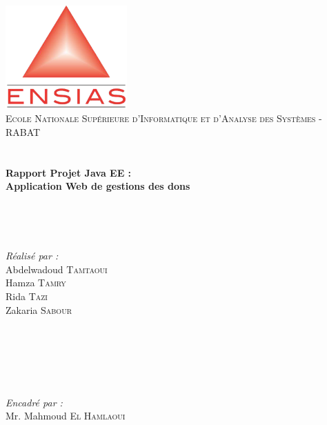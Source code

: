 \begin{titlepage}
\begin{center}

\includegraphics[width=0.35\textwidth]{./ensias}~\\[1.5cm]

\textsc{\Large Ecole Nationale Supérieure d’Informatique et d’Analyse des Systèmes - RABAT }\\[3cm]

\textsc{\Large }\\[0.5cm]

\HRule \\[0.4cm]

{\huge \bfseries Rapport Projet Java EE :\\
Application Web de gestions des dons\\[0.4cm] }

\HRule \\[1.5cm]
\begin{flushright} \large
\emph{      } \\[0.5 cm]
\end{flushright}
\begin{minipage}{0.4\textwidth}
\begin{flushleft} \large
\emph{Réalisé par :}\\[0.5 cm]
\quad Abdelwadoud \textsc{Tamtaoui}\\
\quad Hamza \textsc{Tamry}\\
\quad Rida \textsc{Tazi}\\
\quad Zakaria \textsc{Sabour}\\

\end{flushleft}
\end{minipage}
\begin{minipage}{0.4\textwidth}
\begin{flushright} \large
\emph{      } \\[0.5 cm]
\end{flushright}
\begin{flushright} \large
\emph{      } \\[0.5 cm]
\end{flushright}
\begin{flushright} \large
\emph{      } \\[0.5 cm]
\end{flushright}
\begin{flushright} \large
\emph{Encadré par :} \\[0.5 cm]
Mr. Mahmoud \textsc{El Hamlaoui}\\
\end{flushright}
\end{minipage}


\end{center}
\end{titlepage}
